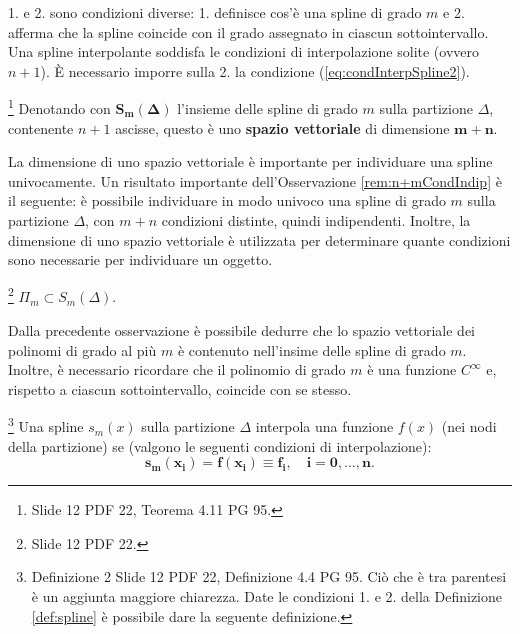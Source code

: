 1. e 2. sono condizioni diverse: 1. definisce cos'è una spline di grado $m$ e 2. afferma che la spline coincide con il grado assegnato in ciascun sottointervallo. Una spline interpolante soddisfa le condizioni di interpolazione solite (ovvero $n+1$). È necessario imporre sulla 2. la condizione (\ref{eq:condInterpSpline2}).

\begin{remark}\label{rem:n+mCondIndip}
    \footnote{Slide 12 PDF 22, Teorema 4.11 PG 95.} Denotando con $\boldsymbol{S_m(\Delta)}$ l'insieme delle spline di grado $m$ sulla partizione $\Delta$, contenente $n+1$ ascisse, questo è uno \textbf{spazio vettoriale} di dimensione $\boldsymbol{m+n}$.
\end{remark}

La dimensione di uno spazio vettoriale è importante per individuare una spline univocamente. Un risultato importante dell'Osservazione \ref{rem:n+mCondIndip} è il seguente: è possibile individuare in modo univoco una spline di grado $m$ sulla partizione $\Delta$, con $m+n$ condizioni distinte, quindi indipendenti. Inoltre, la dimensione di uno spazio vettoriale è utilizzata per determinare quante condizioni sono necessarie per individuare un oggetto.

\begin{remark}
    \footnote{Slide 12 PDF 22.} $\Pi_m\subset S_m(\Delta).$
\end{remark}

Dalla precedente osservazione è possibile dedurre che lo spazio vettoriale dei polinomi di grado al più $m$ è contenuto nell'insime delle spline di grado $m$. Inoltre, è necessario ricordare che il polinomio di grado $m$ è una funzione $C^\infty$ e, rispetto a ciascun sottointervallo, coincide con se stesso.

\begin{definition}\label{def:interpFInDelta}
    \footnote{Definizione 2 Slide 12 PDF 22, Definizione 4.4 PG 95. Ciò che è tra parentesi è un aggiunta maggiore chiarezza. Date le condizioni 1. e 2. della Definizione \ref{def:spline} è possibile dare la seguente definizione.}
    Una spline $s_m(x)$ sulla partizione $\Delta$ interpola una funzione $f(x)$ (nei nodi della partizione) se (valgono le seguenti condizioni di interpolazione): 
    \begin{equation}\label{eq:condInterpSpline}
        \boldsymbol{s_m(x_i)=f(x_i)\equiv f_i,\quad i=0,\hdots,n.}
    \end{equation}
\end{definition}

